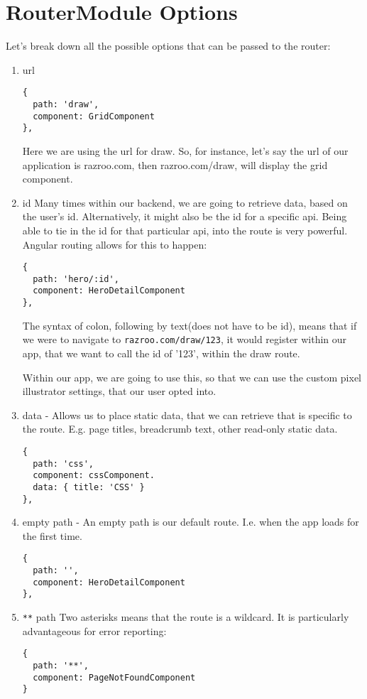 \section{ RouterModule Options }
Let's break down all the possible options that can be passed to the router:
\begin{enumerate}
\item url
\begin{lstlisting}
{
  path: 'draw',
  component: GridComponent
},
\end{lstlisting}
Here we are using the url for draw. So, for instance, let's say the url
of our application is razroo.com, then razroo.com/draw, will display
the grid component.
\item id
Many times within our backend, we are going to retrieve data, based on the 
user's id. Alternatively, it might also be the id for a specific api. Being
able to tie in the id for that particular api, into the route is very 
powerful. Angular routing allows for this to happen: 
\begin{lstlisting}
{
  path: 'hero/:id', 
  component: HeroDetailComponent 
},
\end{lstlisting}
The syntax of colon, following by text(does not have to be id), means that 
if we were to navigate to \lstinline{razroo.com/draw/123}, it would 
register within our app, that we want to call the id of '123', within
the draw route. 

Within our app, we are going to use this, so that we can use the custom 
pixel illustrator settings, that our user opted into. 
\item data - Allows us to place static data, that we can retrieve that is 
specific to the route. E.g. page titles, breadcrumb text, other read-only 
static data.
\begin{lstlisting}
{
  path: 'css', 
  component: cssComponent.
  data: { title: 'CSS' }
},
\end{lstlisting}
\item empty path - An empty path is our default route. I.e. when the app 
loads for the first time. 
\begin{lstlisting}
{
  path: '', 
  component: HeroDetailComponent 
},
\end{lstlisting}
\item \lstinline{**} path
Two asterisks means that the route is a wildcard. It is particularly 
advantageous for error reporting: 
\begin{lstlisting}
{
  path: '**',
  component: PageNotFoundComponent 
}
\end{lstlisting}
\end{enumerate}

